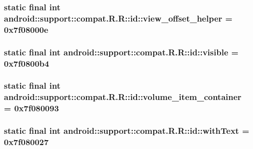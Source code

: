 \hypertarget{classandroid_1_1support_1_1compat_1_1_r_1_1id_4e69ece8ec3baf29b91edf9d57c1909e}{
\subsubsection[{view\_\-offset\_\-helper}]{\setlength{\rightskip}{0pt plus 5cm}static final int android::support::compat.R.R::id::view\_\-offset\_\-helper = 0x7f08000e}}
\label{classandroid_1_1support_1_1compat_1_1_r_1_1id_4e69ece8ec3baf29b91edf9d57c1909e}


\hypertarget{classandroid_1_1support_1_1compat_1_1_r_1_1id_b2d138ff8d52dfb5ae175174eb4561da}{
\subsubsection[{visible}]{\setlength{\rightskip}{0pt plus 5cm}static final int android::support::compat.R.R::id::visible = 0x7f0800b4}}
\label{classandroid_1_1support_1_1compat_1_1_r_1_1id_b2d138ff8d52dfb5ae175174eb4561da}


\hypertarget{classandroid_1_1support_1_1compat_1_1_r_1_1id_82f264e1d4c84c72a343e5e92dc84323}{
\subsubsection[{volume\_\-item\_\-container}]{\setlength{\rightskip}{0pt plus 5cm}static final int android::support::compat.R.R::id::volume\_\-item\_\-container = 0x7f080093}}
\label{classandroid_1_1support_1_1compat_1_1_r_1_1id_82f264e1d4c84c72a343e5e92dc84323}


\hypertarget{classandroid_1_1support_1_1compat_1_1_r_1_1id_408fc9bcbcfea19122c81a748cbb4fc4}{
\subsubsection[{withText}]{\setlength{\rightskip}{0pt plus 5cm}static final int android::support::compat.R.R::id::withText = 0x7f080027}}
\label{classandroid_1_1support_1_1compat_1_1_r_1_1id_408fc9bcbcfea19122c81a748cbb4fc4}


